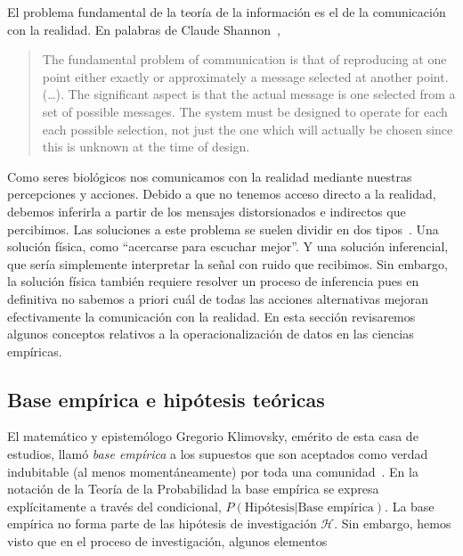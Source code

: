 \documentclass[a4paper,11pt]{book}
\theoremstyle{definition}
\begin{document}
El problema fundamental de la teor\'ia de la informaci\'on es el de la comunicaci\'on con la realidad.
%
En palabras de Claude Shannon~\cite{shannon1948-theoryOfCommunication},
%
\begin{quotation}
The fundamental problem of communication is that of reproducing at one point either exactly or approximately a message selected at another point.
(\dots).
The significant aspect is that the actual message is one selected from a set of possible messages.
The system must be designed to operate for each each possible selection, not just the one which will actually be chosen since this is unknown at the time of design.
\end{quotation}
%
Como seres biológicos nos comunicamos con la realidad mediante nuestras percepciones y acciones.
%
Debido a que no tenemos acceso directo a la realidad, debemos inferirla a partir de los mensajes distorsionados e indirectos que percibimos.
%
Las soluciones a este problema se suelen dividir en dos tipos~\cite{Mackay2003}.
%
Una soluci\'on f\'isica, como ``acercarse para escuchar mejor''.
%
Y una soluci\'on inferencial, que ser\'ia simplemente interpretar la se\~nal con ruido que recibimos.
%
Sin embargo, la soluci\'on f\'isica tambi\'en requiere resolver un proceso de inferencia pues en definitiva no sabemos a priori cuál de todas las acciones alternativas mejoran efectivamente la comunicación con la realidad.
%
En esta sección revisaremos algunos conceptos relativos a la operacionalización de datos en las ciencias emp\'iricas.

\subsection{Base emp\'irica e hipótesis te\'oricas}

El matemático y epistemólogo Gregorio Klimovsky, emérito de esta casa de estudios, llamó \emph{base emp\'irica} a los supuestos que son aceptados como verdad indubitable (al menos momentáneamente) por toda una comunidad~\cite{klimovsky1994-desventuras}.
%
En la notación de la Teor\'ia de la Probabilidad la base emp\'irica se expresa expl\'icitamente a través del condicional, $P(\text{Hipótesis}|\text{Base emp\'irica})$.
%
La base emp\'irica no forma parte de las hipótesis de investigación $\mathcal{H}$.
%
Sin embargo, hemos visto que en el proceso de investigación, algunos elementos
\end{document}
